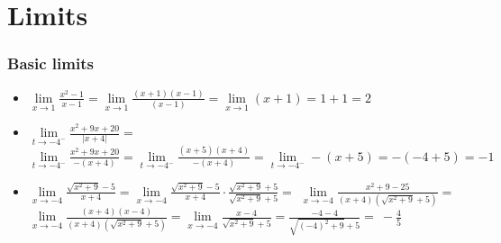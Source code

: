 \iffalse

MIT License

Copyright (c) 2023 Aron Hardeman

Permission is hereby granted, free of charge, to any person obtaining a copy
of this software and associated documentation files (the "Software"), to deal
in the Software without restriction, including without limitation the rights
to use, copy, modify, merge, publish, distribute, sublicense, and/or sell
copies of the Software, and to permit persons to whom the Software is
furnished to do so, subject to the following conditions:

The above copyright notice and this permission notice shall be included in all
copies or substantial portions of the Software.

THE SOFTWARE IS PROVIDED "AS IS", WITHOUT WARRANTY OF ANY KIND, EXPRESS OR
IMPLIED, INCLUDING BUT NOT LIMITED TO THE WARRANTIES OF MERCHANTABILITY,
FITNESS FOR A PARTICULAR PURPOSE AND NONINFRINGEMENT. IN NO EVENT SHALL THE
AUTHORS OR COPYRIGHT HOLDERS BE LIABLE FOR ANY CLAIM, DAMAGES OR OTHER
LIABILITY, WHETHER IN AN ACTION OF CONTRACT, TORT OR OTHERWISE, ARISING FROM,
OUT OF OR IN CONNECTION WITH THE SOFTWARE OR THE USE OR OTHER DEALINGS IN THE
SOFTWARE.

\fi\section{Limits}

\begin{frame}

\frametitle{Basic limits}

\begin{itemize}
\item  $\lim\limits_{x\to1}\frac{x^2-1}{x-1}=$\pause$\lim\limits_{x\to1}\frac{(x+1)(x-1)}{(x-1)}=\lim\limits_{x\to1}(x+1)=1+1=2$
\item\pause $\lim\limits_{t\to-4^-}\frac{x^2+9x+20}{\left|x+4\right|}=$\pause$\lim\limits_{t\to-4^-}\frac{x^2+9x+20}{-(x+4)}=\lim\limits_{t\to-4^-}\frac{(x+5)(x+4)}{-(x+4)}=\lim\limits_{t\to-4^-}-(x+5)=-(-4+5)=-1$
\item\pause $\lim\limits_{x\to-4}\frac{\sqrt{x^2+9}-5}{x+4}=$\pause$\lim\limits_{x\to-4}\frac{\sqrt{x^2+9}-5}{x+4}\cdot\frac{\sqrt{x^2+9}+5}{\sqrt{x^2+9}+5}=$
    \pause$\lim\limits_{x\to-4}\frac{x^2+9-25}{(x+4)(\sqrt{x^2+9}+5)}=$
    \pause$\lim\limits_{x\to-4}\frac{(x+4)(x-4)}{(x+4)(\sqrt{x^2+9}+5)}=$\pause$\lim\limits_{x\to-4}\frac{x-4}{\sqrt{x^2+9}+5}=\frac{-4-4}{\sqrt{(-4)^2+9}+5}=$\pause$~-\frac{4}{5}$
\end{itemize}


\end{frame}

